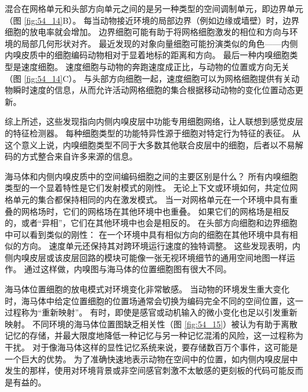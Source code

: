 混合在网格单元和头部方向单元之间的是另一种类型的空间调制单元，即边界单元（图 \ref{fig:54_14}B）。
每当动物接近环境的局部边界（例如边缘或墙壁）时，边界细胞的放电率就会增加。
边界细胞可能有助于将网格细胞激发的相位和方向与环境的局部几何形状对齐。
最近发现的对象向量细胞可能扮演类似的角色——内侧内嗅皮质中的细胞编码动物相对于显着地标的距离和方向。
最后一种内嗅细胞类型是速度细胞。
速度细胞与动物的奔跑速度成正比，与动物的位置或方向无关（图 \ref{fig:54_14}C）。
与头部方向细胞一起，速度细胞可以为网格细胞提供有关动物瞬时速度的信息，从而允许活动网格细胞的集合根据移动动物的变化位置动态更新。


综上所述，这些发现指向内侧内嗅皮层中功能专用细胞网络，让人联想到感觉皮层的特征检测器。
每种细胞类型的功能特异性源于细胞对特定行为特征的表征。
从这个意义上说，内嗅细胞类型不同于大多数其他联合皮层中的细胞，后者以不易解码的方式整合来自许多来源的信息。


海马体和内侧内嗅皮质中的空间编码细胞之间的主要区别是什么？
所有内嗅细胞类型的一个显着特性是它们发射模式的刚性。
无论上下文或环境如何，共定位网格单元的集合都保持相同的内在激发模式。
当一对网格单元在一个环境中具有重叠的网格场时，它们的网格场在其他环境中也重叠。
如果它们的网格场是相反的，或者“异相”，它们在其他环境中也会是相反的。
在头部方向细胞和边界细胞中可以看到类似的刚性：
在一个环境中具有相似方向的细胞在其他环境中具有相似的方向。
速度单元还保持其对跨环境运行速度的独特调整。
这些发现表明，内侧内嗅皮层或该皮层回路的模块可能像一张无视环境细节的通用空间地图一样运作。
通过这样做，内嗅图与海马体的位置细胞图有很大不同。


海马体位置细胞的放电模式对环境变化非常敏感。
当动物的环境发生重大变化时，海马体中给定位置细胞的位置场通常会切换为编码完全不同的空间位置，这一过程称为“重新映射”。
有时，即使是感官或动机输入的微小变化也足以引发重新映射。
不同环境的海马体位置图缺乏相关性（图 \ref{fig:54_15}）被认为有助于离散记忆的存储，并最大限度地降低一种记忆与另一种记忆混淆的风险，这一过程称为干扰。
对于像海马体这样的显性记忆系统来说，要存储数百万个事件，这可能是一个巨大的优势。
为了准确快速地表示动物在空间中的位置，如内侧内嗅皮层中发生的那样，使用对环境背景或非空间感官刺激不太敏感的更刻板的代码可能反而是有益的。


